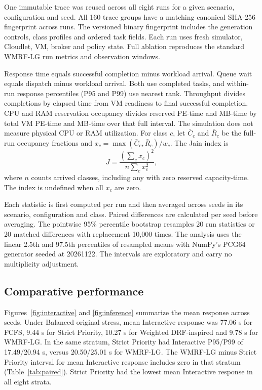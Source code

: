 \documentclass[conference]{IEEEtran}
\newcommand{\wmrf}{WMRF-LG}
\newcommand{\wdrf}{Weighted DRF-inspired}
\begin{document}
One immutable trace was reused across all eight runs for a given scenario, configuration and seed. All 160 trace groups have a matching canonical SHA-256 fingerprint across runs. The versioned binary fingerprint includes the generation controls, class profiles and ordered task fields. Each run uses fresh simulator, Cloudlet, VM, broker and policy state. Full ablation reproduces the standard \wmrf{} run metrics and observation windows.

Response time equals successful completion minus workload arrival. Queue wait equals dispatch minus workload arrival. Both use completed tasks, and within-run response percentiles (P95 and P99) use nearest rank. Throughput divides completions by elapsed time from VM readiness to final successful completion. CPU and RAM reservation occupancy divides reserved PE-time and MB-time by total VM PE-time and MB-time over that full interval. The simulation does not measure physical CPU or RAM utilization. For class $c$, let $\bar C_c$ and $\bar R_c$ be the full-run occupancy fractions and $x_c=\max(\bar C_c,\bar R_c)/w_c$. The Jain index \cite{jain1984fairness} is
\begin{equation}
 J=\frac{(\sum_c x_c)^2}{n\sum_c x_c^2},
 \label{eq:jain}
\end{equation}
where $n$ counts arrived classes, including any with zero reserved capacity-time. The index is undefined when all $x_c$ are zero.

Each statistic is first computed per run and then averaged across seeds in its scenario, configuration and class. Paired differences are calculated per seed before averaging. The pointwise 95\% percentile bootstrap \cite{efron1986bootstrap} resamples 20 run statistics or 20 matched differences with replacement 10,000 times. The analysis uses the linear 2.5th and 97.5th percentiles of resampled means with NumPy's PCG64 generator seeded at 20261122. The intervals are exploratory and carry no multiplicity adjustment.

\subsection{Comparative performance}
Figures~\ref{fig:interactive} and \ref{fig:inference} summarize the mean response across seeds. Under Balanced original stress, mean Interactive response was 77.06 s for FCFS, 9.44 s for Strict Priority, 10.27 s for \wdrf{} and 9.78 s for \wmrf{}. In the same stratum, Strict Priority had Interactive P95/P99 of 17.49/20.94 s, versus 20.50/25.01 s for \wmrf{}. The WMRF-LG minus Strict Priority interval for mean Interactive response includes zero in that stratum (Table~\ref{tab:paired}). Strict Priority had the lowest mean Interactive response in all eight strata.
\end{document}
